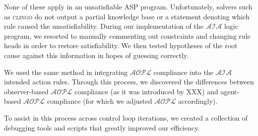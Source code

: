 None of these apply in an unsatisfiable ASP program.
Unfortunately, solvers such as \textsc{clingo} do not output a partial knowledge base or a statement denoting which rule caused the unsatisfiability.
During our implementation of the $\mathcal{AIA}$ logic program, we resorted to manually commenting out constraints and changing rule heads in order to restore satisfiability.
We then tested hypotheses of the root cause against this information in hopes of guessing correctly.

We used the same method in integrating $\mathcal{AOPL}$ compliance into the $\mathcal{AIA}$ intended action rules.
Through this process, we discovered the differences between observer-based $\mathcal{AOPL}$ compliance (as it was introduced by XXX) and agent-based $\mathcal{AOPL}$ compliance (for which we adjusted $\mathcal{AOPL}$ accordingly).

To assist in this process across control loop iterations, we created a collection of debugging tools and scripts that greatly improved our efficiency.
